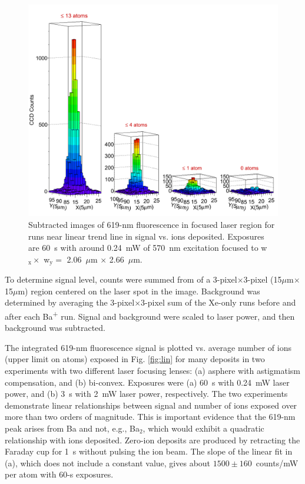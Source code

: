 \begin{figure} %
        \centering
                \includegraphics[width=.99\textwidth]{figures/train.png}
                \caption{Subtracted images of 619-nm fluorescence in focused laser region for runs near linear trend line in signal vs. ions deposited.  Exposures are 60~s with around 0.24~mW of 570~nm excitation focused to w$_{\text{x}} \times$ w$_{\text{y}} =$ 2.06~$\mu$m $\times$ 2.66~$\mu$m.}
\label{fig:train}
\end{figure}

To determine signal level, counts were summed from of a 3-pixel$\times$3-pixel (15$\mu$m$\times$15$\mu$m) region centered on the laser spot in the image.  Background was determined by averaging the 3-pixel$\times$3-pixel sum of the Xe-only runs before and after each Ba\textsuperscript{+} run.  Signal and background were scaled to laser power, and then background was subtracted.

The integrated 619-nm fluorescence signal is plotted vs. average number of ions (upper limit on atoms) exposed in Fig. \ref{fig:lin} for many deposits in two experiments with two different laser focusing lenses:  (a) asphere with astigmatism compensation, and (b) bi-convex.  Exposures were (a) 60~s with 0.24~mW laser power, and (b) 3~s with 2~mW laser power, respectively.  The two experiments demonstrate linear relationships between signal and number of ions exposed over more than two orders of magnitude.  This is important evidence that the 619-nm peak arises from Ba and not, e.g., Ba$_{2}$, which would exhibit a quadratic relationship with ions deposited.  Zero-ion deposits are produced by retracting the Faraday cup for 1~s without pulsing the ion beam.  The slope of the linear fit in (a), which does not include a constant value, gives about $1500 \pm 160$~counts/mW per atom with 60-s exposures.  %


